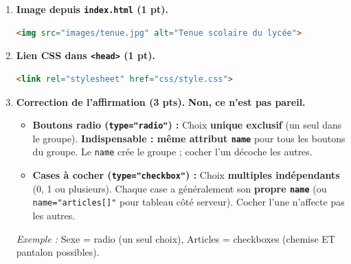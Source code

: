 \documentclass[11pt]{article}
\begin{document}
\begin{corrige}
\begin{enumerate}
\begin{lstlisting}[language=HTML]
    <p>
      <label for="nom_eleve">Nom de l'élève :</label>
      <input type="text" id="nom_eleve" name="nom_eleve" required>
    </p>
    
    <p>
      <label for="taille">Taille :</label>
      <select id="taille" name="taille">
        <option value="S">S</option>
        <option value="M">M</option>
        <option value="L">L</option>
        <option value="XL">XL</option>
      </select>
    </p>
    
    <fieldset>
      <legend>Articles (choix multiples)</legend>
      <label><input type="checkbox" name="articles[]" value="chemise"> Chemise</label>
      <label><input type="checkbox" name="articles[]" value="pantalon"> Pantalon</label>
      <label><input type="checkbox" name="articles[]" value="jupe"> Jupe</label>
    </fieldset>
    
    <p>
      <label for="quantite">Quantité :</label>
      <input type="number" id="quantite" name="quantite" min="1" value="1">
    </p>
    
    <p>
      <input type="submit" value="Envoyer">
      <input type="reset" value="Effacer">
    </p>
  </fieldset>
</form>
\end{lstlisting}
  
  \item \textbf{Image depuis \texttt{index.html} (1 pt).}
\begin{lstlisting}[language=HTML]
<img src="images/tenue.jpg" alt="Tenue scolaire du lycée">
\end{lstlisting}
  
  \item \textbf{Lien CSS dans \texttt{<head>} (1 pt).}
\begin{lstlisting}[language=HTML]
<link rel="stylesheet" href="css/style.css">
\end{lstlisting}
  
  \item \textbf{Correction de l'affirmation (3 pts).}
  \textbf{Non, ce n'est pas pareil.}
  \begin{itemize}
    \item \textbf{Boutons radio (\texttt{type="radio"}) :} Choix \textbf{unique exclusif} (un seul dans le groupe). \textbf{Indispensable : même attribut \texttt{name}} pour tous les boutons du groupe. Le \texttt{name} crée le groupe ; cocher l'un décoche les autres.
    \item \textbf{Cases à cocher (\texttt{type="checkbox"}) :} Choix \textbf{multiples indépendants} (0, 1 ou plusieurs). Chaque case a généralement son \textbf{propre \texttt{name}} (ou \texttt{name="articles[]"} pour tableau côté serveur). Cocher l'une n'affecte pas les autres.
  \end{itemize}
  \textit{Exemple :} Sexe = radio (un seul choix), Articles = checkboxes (chemise ET pantalon possibles).
\end{enumerate}


\end{corrige}
\end{document}
